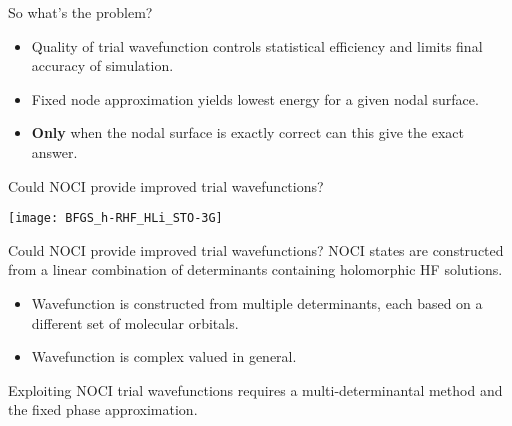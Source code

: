 \documentclass{beamer}
\begin{document}
\begin{frame}{So what's the problem?}
  \begin{itemize}
    \item Quality of trial wavefunction controls statistical efficiency and limits final accuracy of simulation.
    \item Fixed node approximation yields lowest energy for a given nodal surface.
    \item \textbf{Only} when the nodal surface is exactly correct can this give the exact answer.
  \end{itemize}
\end{frame}
\begin{frame}{Could NOCI provide improved trial wavefunctions?}
  \vspace{-0.8em}
  \begin{center}
    \texttt{[image: BFGS\_h-RHF\_HLi\_STO-3G]}
  \end{center}

\end{frame}
\begin{frame}{Could NOCI provide improved trial wavefunctions?}
  NOCI states are constructed from a linear combination of determinants containing holomorphic HF solutions.
\vspace{1em}  
  \begin{itemize}
   \item Wavefunction is constructed from multiple determinants, each based on a different set of molecular orbitals.
   \item Wavefunction is complex valued in general.
  \end{itemize}
  \vspace{1em}  
  Exploiting NOCI trial wavefunctions requires a \alert{multi-determinantal} method and the \alert{fixed phase} approximation.
\end{frame}
\end{document}
